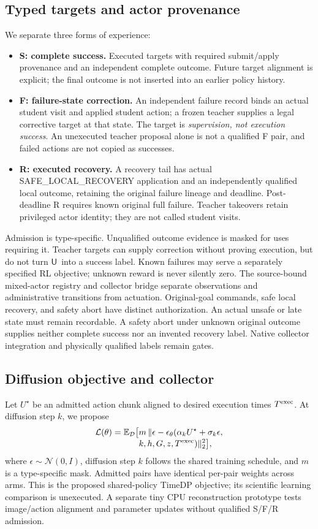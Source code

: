 \documentclass{article}
\newcommand{\Unk}{\ensuremath{\mathsf{U}}}
\newcommand{\Data}{\mathcal{D}}
\begin{document}
\subsection{Typed targets and actor provenance}
We separate three forms of experience:
\begin{itemize}
\item \textbf{S: complete success.} Executed targets with required submit/apply provenance and an independent complete outcome. Future target alignment is explicit; the final outcome is not inserted into an earlier policy history.
\item \textbf{F: failure-state correction.} An independent failure record binds an actual student visit and applied student action; a frozen teacher supplies a legal corrective target at that state. The target is \emph{supervision, not execution success}. An unexecuted teacher proposal alone is not a qualified F pair, and failed actions are not copied as successes.
\item \textbf{R: executed recovery.} A recovery tail has actual SAFE\_LOCAL\_RECOVERY application and an independently qualified local outcome, retaining the original failure lineage and deadline. Post-deadline R requires known original full failure. Teacher takeovers retain privileged actor identity; they are not called student visits.
\end{itemize}
Admission is type-specific. Unqualified outcome evidence is masked for uses requiring it. Teacher targets can supply correction without proving execution, but do not turn \Unk\ into a success label. Known failures may serve a separately specified RL objective; unknown reward is never silently zero. The source-bound mixed-actor registry and collector bridge separate observations and administrative transitions from actuation. Original-goal commands, safe local recovery, and safety abort have distinct authorization. An actual unsafe or late state must remain recordable. A safety abort under unknown original outcome supplies neither complete success nor an invented recovery label. Native collector integration and physically qualified labels remain gates.

\subsection{Diffusion objective and collector}
Let \(U^\star\) be an admitted action chunk aligned to desired execution times \(T^{\rm exec}\). At diffusion step \(k\), we propose
\begin{align}
\mathcal{L}(\theta)=\mathbb{E}_{\Data}\big[&m\,\|\epsilon-\epsilon_\theta(\alpha_kU^\star+\sigma_k\epsilon,\nonumber\\[-1mm]
&k,h,G,z,T^{\rm exec})\|_2^2\big],
\label{eq:loss}
\end{align}
where \(\epsilon\sim\mathcal{N}(0,I)\), diffusion step \(k\) follows the shared training schedule, and \(m\) is a type-specific mask. Admitted pairs have identical per-pair weights across arms. This is the proposed shared-policy TimeDP objective; its scientific learning comparison is unexecuted. A separate tiny CPU reconstruction prototype tests image/action alignment and parameter updates without qualified S/F/R admission.
\end{document}
